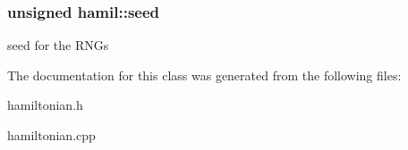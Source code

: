 \subsubsection[{\texorpdfstring{seed}{seed}}]{\setlength{\rightskip}{0pt plus 5cm}unsigned hamil\+::seed}\hypertarget{classhamil_ad69ef2d8298340ce7c49617f5ffc1b46}{}\label{classhamil_ad69ef2d8298340ce7c49617f5ffc1b46}
seed for the R\+N\+Gs 

The documentation for this class was generated from the following files\+:\begin{DoxyCompactItemize}
\item 
hamiltonian.\+h\item 
hamiltonian.\+cpp\end{DoxyCompactItemize}
